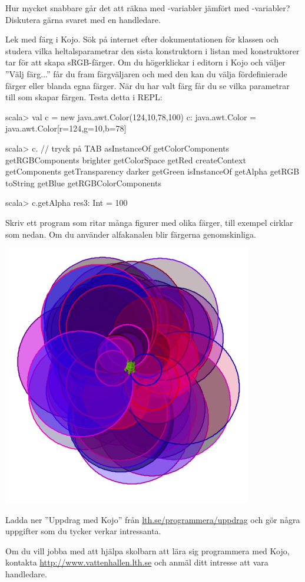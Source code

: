 \Subtask Hur mycket snabbare går det att räkna med -variabler jämfört med -variabler? Diskutera gärna svaret med en handledare.

\Task Lek med färg i Kojo. Sök på internet efter dokumentationen för klassen  och studera vilka heltalsparametrar den sista konstruktorn i listan med konstruktorer tar för att skapa sRGB-färger. Om du högerklickar i editorn i Kojo och väljer ''Välj färg...'' får du fram färgväljaren och med den kan du välja fördefinierade färger eller blanda egna färger. När du har valt färg får du se vilka parametrar till  som skapar färgen. Testa detta i REPL:

\begin{REPL}
scala> val c = new java.awt.Color(124,10,78,100)
c: java.awt.Color = java.awt.Color[r=124,g=10,b=78]

scala> c.  // tryck på TAB
asInstanceOf    getColorComponents      getRGBComponents
brighter        getColorSpace           getRed
createContext   getComponents           getTransparency
darker          getGreen                isInstanceOf
getAlpha        getRGB                  toString
getBlue         getRGBColorComponents

scala> c.getAlpha
res3: Int = 100
\end{REPL}
Skriv ett program som ritar många figurer med olika färger, till exempel cirklar som nedan. Om du använder alfakanalen blir färgerna genomskinliga.

\includegraphics[width=0.82\textwidth]{../img/kojo/random-color-circles.png}


\Task Ladda ner ''Uppdrag med Kojo'' från \href{http://lth.se/programmera/uppdrag}{lth.se/programmera/uppdrag}  och gör några uppgifter som du tycker verkar intressanta.


\Task Om du vill jobba med att hjälpa skolbarn att lära sig programmera med Kojo, kontakta \url{http://www.vattenhallen.lth.se} och anmäl ditt intresse att vara handledare.
